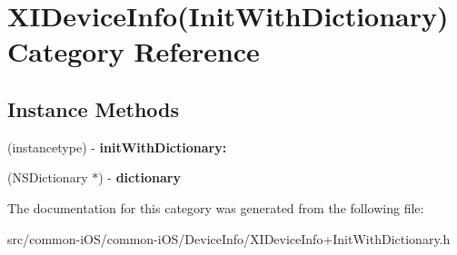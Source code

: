 \hypertarget{category_x_i_device_info_07_init_with_dictionary_08}{}\section{X\+I\+Device\+Info(Init\+With\+Dictionary) Category Reference}
\label{category_x_i_device_info_07_init_with_dictionary_08}
\subsection*{Instance Methods}
\begin{DoxyCompactItemize}
\item 
\hypertarget{category_x_i_device_info_07_init_with_dictionary_08_ae331cb2141cac26c4b56dd292a9db9f6}{}\label{category_x_i_device_info_07_init_with_dictionary_08_ae331cb2141cac26c4b56dd292a9db9f6} 
(instancetype) -\/ {\bfseries init\+With\+Dictionary\+:}
\item 
\hypertarget{category_x_i_device_info_07_init_with_dictionary_08_a389ba1c44ed1b2f27683c87509e4d6b8}{}\label{category_x_i_device_info_07_init_with_dictionary_08_a389ba1c44ed1b2f27683c87509e4d6b8} 
(N\+S\+Dictionary $\ast$) -\/ {\bfseries dictionary}
\end{DoxyCompactItemize}


The documentation for this category was generated from the following file\+:\begin{DoxyCompactItemize}
\item 
src/common-\/i\+O\+S/common-\/i\+O\+S/\+Device\+Info/X\+I\+Device\+Info+\+Init\+With\+Dictionary.\+h\end{DoxyCompactItemize}
